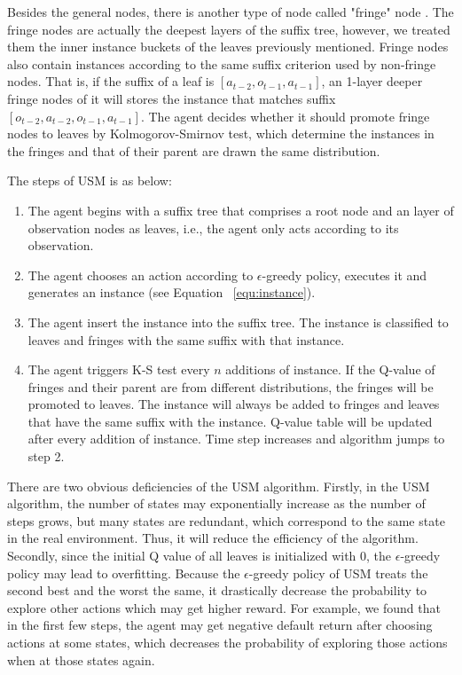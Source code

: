 \documentclass{article}
\begin{document}
Besides the general nodes, there is another type of node called "fringe" node \cite{mccallum1995instance}.
The fringe nodes are actually the deepest layers of the suffix tree, however, we treated them
the inner instance buckets of the leaves previously mentioned. Fringe nodes also contain
instances according to the same suffix criterion used by non-fringe nodes. That is, 
if the suffix of a leaf is $[a_{t-2}, o_{t-1}, a_{t-1}]$, an 1-layer deeper fringe nodes of it
will stores the instance that matches suffix $[o_{t-2}, a_{t-2}, o_{t-1}, a_{t-1}]$. The agent decides
whether it should promote fringe nodes to leaves by Kolmogorov-Smirnov test, which determine the
instances in the fringes and that of their parent are drawn the same distribution.

The steps of USM is as below:

\begin{enumerate}
  \item The agent begins with a suffix tree that comprises a root node and an layer of
  observation nodes as leaves, i.e., the agent only acts according to its observation.

  \item The agent chooses an action according to $\epsilon$-greedy policy, executes it and
  generates an instance (see Equation ~\ref{equ:instance}).

  \item The agent insert the instance into the suffix tree. The instance is classified to
  leaves and fringes with the same suffix with that instance. 

  \item The agent triggers K-S test every $n$ additions of instance. If the Q-value of fringes
  and their parent are from different distributions, the fringes will be promoted to leaves.
  The instance will always be added to fringes and leaves that have the same suffix with the instance.
  Q-value table will be updated after every addition of instance. Time step increases and algorithm
  jumps to step 2.
\end{enumerate}

There are two obvious deficiencies of the USM algorithm. Firstly, in the USM algorithm,
the number of states may exponentially increase as the number of steps grows, but many
states are redundant, which correspond to the same state in the real environment. Thus, it
will reduce the efficiency of the algorithm. Secondly, since the initial Q value of all leaves
is initialized with 0, the $\epsilon$-greedy policy may lead to overfitting. Because
the $\epsilon$-greedy policy of USM treats the second best and the worst the same, it drastically
decrease the probability to explore other actions which may get higher reward. For example,
we found that in the first few steps, the agent may get negative default return after
choosing actions at some states, which decreases the probability of exploring those actions
when at those states again.
\end{document}
